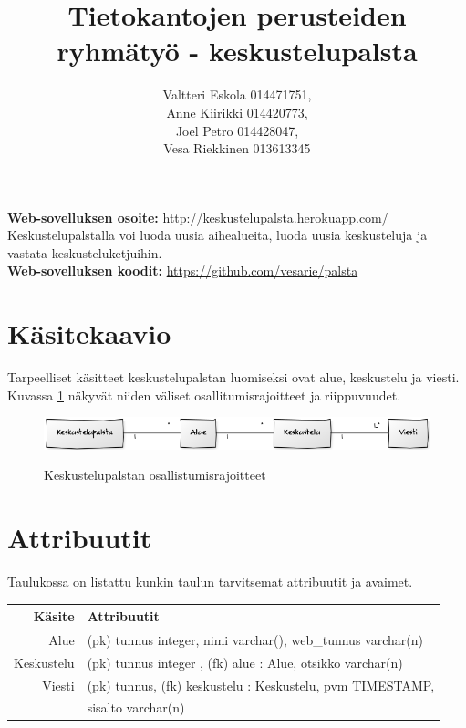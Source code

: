 \documentclass[titlepage]{article}
\title{Tietokantojen perusteiden ryhm\"aty\"o - keskustelupalsta}
\author{Valtteri Eskola 014471751, \\ Anne Kiirikki 014420773, \\ Joel Petro 014428047, \\ Vesa Riekkinen 013613345}
\date{}
\begin{document}
\maketitle

\noindent \textbf{Web-sovelluksen osoite:} \href{
http://keskustelupalsta.herokuapp.com/}{
http://keskustelupalsta.herokuapp.com/} \\
\noindent Keskustelupalstalla voi luoda uusia aihealueita, luoda uusia keskusteluja ja vastata keskusteluketjuihin.\\

\noindent \textbf{Web-sovelluksen koodit:} \href{https://github.com/vesarie/palsta}{https://github.com/vesarie/palsta}

\section*{Käsitekaavio}
Tarpeelliset käsitteet keskustelupalstan luomiseksi  ovat alue, keskustelu ja viesti. Kuvassa \ref{käsite} näkyvät niiden väliset osallitumisrajoitteet ja riippuvuudet.

\begin{figure}[H]
\includegraphics[width=\textwidth]{kasitekaavio}
\label{käsite}
\caption{Keskustelupalstan osallistumisrajoitteet}
\end{figure}

\section*{Attribuutit}

\noindent Taulukossa on listattu kunkin taulun tarvitsemat attribuutit ja avaimet. \\

{
\centering
\begin{tabular}[width=\textwidth]{r|l}

Käsite & Attribuutit \\
\hline
Alue & (pk) tunnus integer, nimi varchar(), web{\_}tunnus varchar(n) \\
Keskustelu & (pk) tunnus integer , (fk) alue : Alue,  otsikko varchar(n) \\
Viesti & (pk) tunnus, (fk) keskustelu : Keskustelu, pvm TIMESTAMP, \\
& sisalto varchar(n) \\
\end{tabular}
} \\
\end{document}
